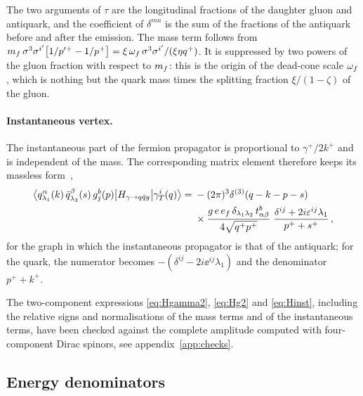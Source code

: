 The two arguments of $\tau$ are the longitudinal fractions of the daughter gluon and antiquark, and
the coefficient of $\delta^{mn}$ is the sum of the fractions of the antiquark before and after the
emission. The mass term follows from
$m_f\,\sigma^3\sigma^{i'}\big[1/p'^+-1/p^+\big]=\xi\,\omega_f\,\sigma^3\sigma^{i'}/(\xi\eta q^+)$. It is
suppressed by two powers of the gluon fraction with respect to $m_f$: this is the origin of the
dead-cone scale $\omega_f$, which is nothing but the quark mass times the splitting fraction
$\xi/(1-\zeta)$ of the gluon.

\paragraph{Instantaneous vertex.} The instantaneous part of the fermion propagator is proportional to
$\gamma^+/2k^+$ and is independent of the mass. The corresponding matrix element therefore keeps its
massless form~\cite{Iancu:2022gpw},
\begin{align}
\big\langle q^\alpha_{\lambda_1}(k)\,\bar q^\beta_{\lambda_2}(s)\,g^b_j(p)\big|H_{\gamma\to q\bar q g}\big|\gamma_T^i(q)\big\rangle
={}&-(2\pi)^3\delta^{(3)}(q-k-p-s)
\nonumber\\
&\times\frac{g\,e\,e_f\,\delta_{\lambda_1\lambda_2}\,t^b_{\alpha\beta}}{4\sqrt{q^+p^+}}\;
\frac{\delta^{ij}+2i\varepsilon^{ij}\lambda_1}{p^++s^+}\,,
\label{eq:Hinst}
\end{align}
for the graph in which the instantaneous propagator is that of the antiquark; for the quark, the
numerator becomes $-(\delta^{ij}-2i\ee^{ij}\lambda_1)$ and the denominator $p^++k^+$.

The two-component expressions \eqref{eq:Hgamma2}, \eqref{eq:Hg2} and \eqref{eq:Hinst}, including the
relative signs and normalisations of the mass terms and of the instantaneous terms, have been checked
against the complete amplitude computed with four-component Dirac spinors, see
appendix~\ref{app:checks}.

\subsection{Energy denominators}
\label{sec:den}

